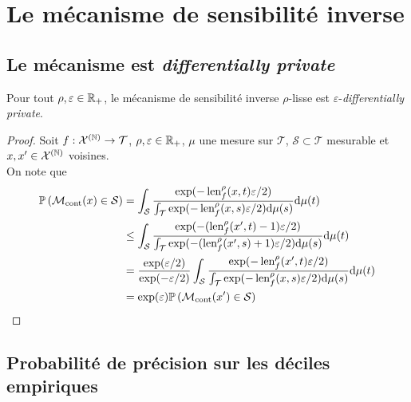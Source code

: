 \section{Le mécanisme de sensibilité inverse}

\subsection{Le mécanisme est \textit{differentially private}}\label{ISDP}

\begin{theorem}
    Pour tout \(\rho,\varepsilon \in \mathbb{R}_+\), le mécanisme de sensibilité inverse \(\rho\)-lisse est \(\varepsilon\)-\textit{differentially private}.
\end{theorem}


\begin{proof}
    Soit \(f : \mathcal X^{(\mathbb{N})} \to \mathcal T\), \(\rho, \varepsilon \in \mathbb{R}_+\), \(\mu\) une mesure sur \(\mathcal T\), \(\mathcal S \subset \mathcal T\) mesurable et \(x,x' \in \mathcal X^{(\mathbb{N})}\) voisines. \\

    On note que 
    \begin{align*}
        \mathbb P\left(\mathcal  M_{\text{cont}}(x) \in \mathcal S \right) & = \int_\mathcal S \dfrac{\exp(-\operatorname{len}_f^\rho(x, t)\varepsilon/2)}{\int_\mathcal T \exp(-\operatorname{len}_f^\rho(x, s)\varepsilon/2)\mathrm{d} \mu(s)}    \mathrm{d} \mu(t)\\
        & \leq \int_\mathcal S \dfrac{\exp(-(\operatorname{len}_f^\rho(x', t)-1)\varepsilon/2)}{\int_\mathcal T \exp(-(\operatorname{len}_f^\rho(x', s)+1)\varepsilon/2)\mathrm{d} \mu(s)}    \mathrm{d} \mu(t)\\
        & = \dfrac{\exp(\varepsilon/2)}{\exp(-\varepsilon/2)}\int_\mathcal S \dfrac{\exp(-\operatorname{len}_f^\rho(x', t)\varepsilon/2)}{\int_\mathcal T \exp(-\operatorname{len}_f^\rho(x, s)\varepsilon/2)\mathrm{d} \mu(s)}    \mathrm{d} \mu(t)\\
        & = \exp(\varepsilon) \mathbb P\left(\mathcal  M_{\text{cont}}(x') \in \mathcal S \right)
    \end{align*}
\end{proof}


\subsection{Probabilité de précision sur les déciles empiriques}\label{SI_empi}

